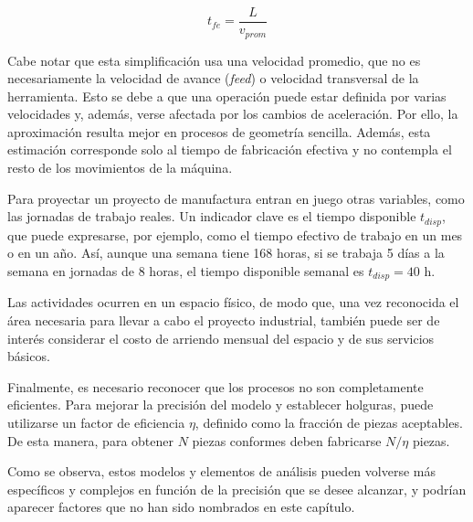 \begin{equation}
	t_{fe}=\frac{L}{v_{prom}}
	\label{eq:tiempo_efectivo}
\end{equation}

Cabe notar que esta simplificación usa una velocidad promedio, que no es necesariamente la velocidad de avance (\textit{feed}) o velocidad transversal de la herramienta. Esto se debe a que una operación puede estar definida por varias velocidades y, además, verse afectada por los cambios de aceleración. Por ello, la aproximación resulta mejor en procesos de geometría sencilla. Además, esta estimación corresponde solo al tiempo de fabricación efectiva y no contempla el resto de los movimientos de la máquina.

Para proyectar un proyecto de manufactura entran en juego otras variables, como las jornadas de trabajo reales. Un indicador clave es el tiempo disponible $t_{disp}$, que puede expresarse, por ejemplo, como el tiempo efectivo de trabajo en un mes o en un año. Así, aunque una semana tiene 168 horas, si se trabaja 5 días a la semana en jornadas de 8 horas, el tiempo disponible semanal es $t_{disp}=40$ h.

Las actividades ocurren en un espacio físico, de modo que, una vez reconocida el área necesaria para llevar a cabo el proyecto industrial, también puede ser de interés considerar el costo de arriendo mensual del espacio y de sus servicios básicos.

Finalmente, es necesario reconocer que los procesos no son completamente eficientes. Para mejorar la precisión del modelo y establecer holguras, puede utilizarse un factor de eficiencia $\eta$, definido como la fracción de piezas aceptables. De esta manera, para obtener $N$ piezas conformes deben fabricarse $N/\eta$ piezas.

Como se observa, estos modelos y elementos de análisis pueden volverse más específicos y complejos en función de la precisión que se desee alcanzar, y podrían aparecer factores que no han sido nombrados en este capítulo.